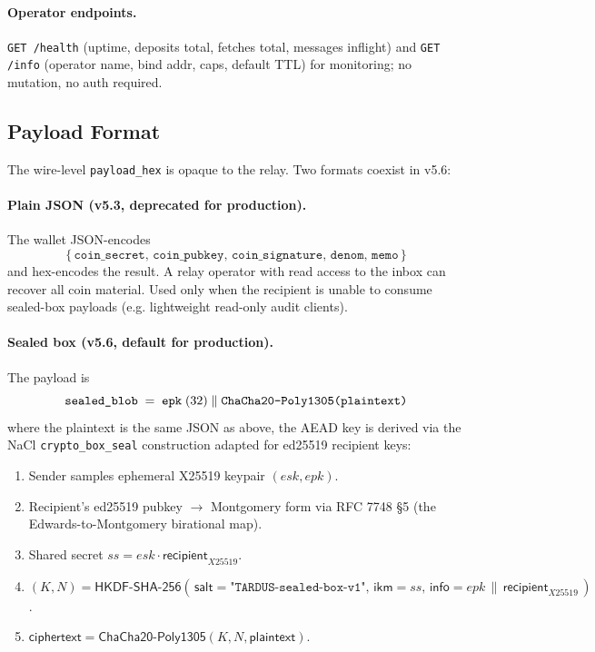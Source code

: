 \paragraph{Operator endpoints.} \verb|GET /health| (uptime, deposits
total, fetches total, messages inflight) and \verb|GET /info|
(operator name, bind addr, caps, default TTL) for monitoring; no
mutation, no auth required.

\subsection{Payload Format}
\label{sec:relay-payload}

The wire-level \verb|payload_hex| is opaque to the relay. Two formats
coexist in v5.6:

\paragraph{Plain JSON (v5.3, deprecated for production).} The wallet
JSON-encodes
\[
  \{\,\texttt{coin\_secret},\,\texttt{coin\_pubkey},\,\texttt{coin\_signature},\,\texttt{denom},\,\texttt{memo}\,\}
\]
and hex-encodes the result. A relay operator with read access to the
inbox can recover all coin material. Used only when the recipient is
unable to consume sealed-box payloads (e.g. lightweight read-only
audit clients).

\paragraph{Sealed box (v5.6, default for production).} The payload is
\[
  \texttt{sealed\_blob} \;=\; \texttt{epk}\;(32)\;\|\;\texttt{ChaCha20\text{-}Poly1305(plaintext)}
\]
where the plaintext is the same JSON as above, the AEAD key is derived
via the NaCl \verb|crypto_box_seal| construction adapted for ed25519
recipient keys:

\begin{enumerate}[leftmargin=2em,itemsep=0pt]
  \item Sender samples ephemeral X25519 keypair $(esk, epk)$.
  \item Recipient's ed25519 pubkey $\to$ Montgomery form via RFC 7748
        §5 (the Edwards-to-Montgomery birational map).
  \item Shared secret $ss = esk \cdot \mathsf{recipient}_{X25519}$.
  \item $(K, N) =
        \mathsf{HKDF\text{-}SHA\text{-}256}(\,\mathsf{salt}=\texttt{"TARDUS-sealed-box-v1"},\,
                                            \mathsf{ikm}=ss,\,
                                            \mathsf{info}=epk \,\|\, \mathsf{recipient}_{X25519}\,)$.
  \item $\mathsf{ciphertext} =
        \mathsf{ChaCha20\text{-}Poly1305}(K, N, \mathsf{plaintext})$.
\end{enumerate}

